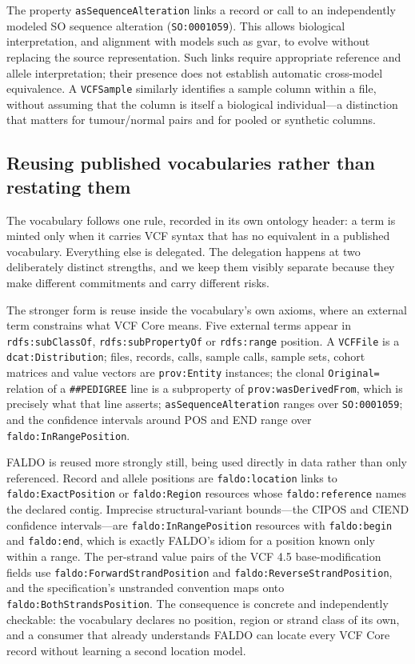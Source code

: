 \documentclass{ceurart}
\newcommand{\term}[1]{\texttt{#1}}
\begin{document}
The property \term{asSequenceAlteration} links a record or call to an independently modeled SO sequence alteration (\term{SO:0001059}). This allows biological interpretation, and alignment with models such as gvar, to evolve without replacing the source representation. Such links require appropriate reference and allele interpretation; their presence does not establish automatic cross-model equivalence. A \term{VCFSample} similarly identifies a sample column within a file, without assuming that the column is itself a biological individual---a distinction that matters for tumour/normal pairs and for pooled or synthetic columns.

\subsection{Reusing published vocabularies rather than restating them}
\label{sec:reuse}

The vocabulary follows one rule, recorded in its own ontology header: a term is minted only when it carries VCF syntax that has no equivalent in a published vocabulary. Everything else is delegated. The delegation happens at two deliberately distinct strengths, and we keep them visibly separate because they make different commitments and carry different risks.

The stronger form is reuse inside the vocabulary's own axioms, where an external term constrains what VCF Core means. Five external terms appear in \term{rdfs:subClassOf}, \term{rdfs:subPropertyOf} or \term{rdfs:range} position. A \term{VCFFile} is a \term{dcat:Distribution}; files, records, calls, sample calls, sample sets, cohort matrices and value vectors are \term{prov:Entity} instances; the clonal \term{Original=} relation of a \term{\#\#PEDIGREE} line is a subproperty of \term{prov:wasDerivedFrom}, which is precisely what that line asserts; \term{asSequenceAlteration} ranges over \term{SO:0001059}; and the confidence intervals around POS and END range over \term{faldo:InRangePosition}.

FALDO is reused more strongly still, being used directly in data rather than only referenced. Record and allele positions are \term{faldo:location} links to \term{faldo:ExactPosition} or \term{faldo:Region} resources whose \term{faldo:reference} names the declared contig. Imprecise structural-variant bounds---the CIPOS and CIEND confidence intervals---are \term{faldo:InRangePosition} resources with \term{faldo:begin} and \term{faldo:end}, which is exactly FALDO's idiom for a position known only within a range. The per-strand value pairs of the VCF 4.5 base-modification fields use \term{faldo:ForwardStrandPosition} and \term{faldo:ReverseStrandPosition}, and the specification's unstranded convention maps onto \term{faldo:BothStrandsPosition}. The consequence is concrete and independently checkable: the vocabulary declares no position, region or strand class of its own, and a consumer that already understands FALDO can locate every VCF Core record without learning a second location model.
\end{document}
